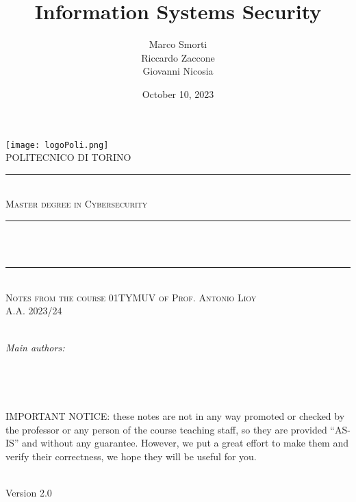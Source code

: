 \documentclass[11pt]{report}
\title{Information Systems Security}				        %
\author{Marco Smorti \\ Riccardo Zaccone \\ Giovanni Nicosia}   %
\date{October 10, 2023}								    %
\makeatletter
\let\thetitle\@title
\let\theauthor\@author
\let\thedate\@date
\makeatother
\begin{document}

\begin{titlepage}
	\centering
	\texttt{[image: logoPoli.png]}\\[1.0 cm]
	\textsc{\LARGE POLITECNICO DI TORINO}\\[-0.2 cm]		%
	\rule{\linewidth}{0.2 mm} \\
	\textsc{\large Master degree in Cybersecurity}\\[1.0 cm]
	\rule{\linewidth}{0.2 mm} \\[0.4 cm]
	{ \huge \bfseries \thetitle}\\
	\rule{\linewidth}{0.2 mm} \\%
	\textsc{\Large Notes from the course 01TYMUV of Prof. Antonio Lioy \\ A.A. 2023/24}\\[0 cm]
	\textsc{}\\[0.4 cm]

	\begin{minipage}{0.4\textwidth}
		\begin{flushleft} \large
			\emph{Main authors:}\\
			\theauthor
		\end{flushleft}
	\end{minipage}~
	\begin{minipage}{0.4\textwidth}
		\begin{flushright} \large
		\end{flushright}
	\end{minipage}\\[1.0 cm]



	\begin{minipage}{\textwidth}
		IMPORTANT NOTICE: these notes are not in any way promoted or checked by the professor or any
		person of the course teaching staff, so they are provided “AS-IS” and without any guarantee. However,
		we put a great effort to make them and verify their correctness, we hope they will be useful for you.
	\end{minipage}\\ [0.5 cm]

	{\large Version 2.0 \\ \thedate}\\


\end{titlepage}



\tableofcontents
\pagebreak
\end{document}
